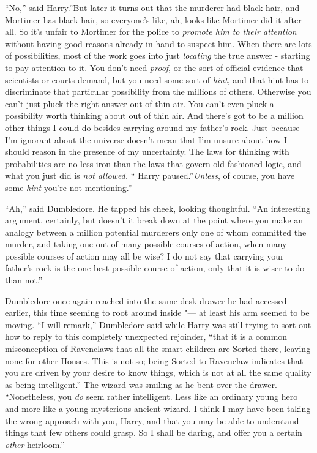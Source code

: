 ``No,'' said Harry.''But later it turns out that the murderer had black
hair, and Mortimer has black hair, so everyone's like, ah, looks like
Mortimer did it after all. So it's unfair to Mortimer for the police to
\emph{promote him to their attention} without having good reasons
already in hand to suspect him. When there are lots of possibilities,
most of the work goes into just \emph{locating} the true answer -
starting to pay attention to it. You don't need \emph{proof}, or the
sort of official evidence that scientists or courts demand, but you need
some sort of \emph{hint}, and that hint has to discriminate that
particular possibility from the millions of others. Otherwise you can't
just pluck the right answer out of thin air. You can't even pluck a
possibility worth thinking about out of thin air. And there's got to be
a million other things I could do besides carrying around my father's
rock. Just because I'm ignorant about the universe doesn't mean that I'm
unsure about how I should reason in the presence of my uncertainty. The
laws for thinking with probabilities are no less iron than the laws that
govern old-fashioned logic, and what you just did is \emph{not allowed.}
`` Harry paused.''\emph{Unless}, of course, you have some \emph{hint}
you're not mentioning.''

``Ah,'' said Dumbledore. He tapped his cheek, looking thoughtful. ``An
interesting argument, certainly, but doesn't it break down at the point
where you make an analogy between a million potential murderers only one
of whom committed the murder, and taking one out of many possible
courses of action, when many possible courses of action may all be wise?
I do not say that carrying your father's rock is the one best possible
course of action, only that it is wiser to do than not.''

Dumbledore once again reached into the same desk drawer he had accessed
earlier, this time seeming to root around inside "--- at least his arm
seemed to be moving. ``I will remark,'' Dumbledore said while Harry was
still trying to sort out how to reply to this completely unexpected
rejoinder, ``that it is a common misconception of Ravenclaws that all
the smart children are Sorted there, leaving none for other Houses. This
is not so; being Sorted to Ravenclaw indicates that you are driven by
your desire to know things, which is not at all the same quality as
being intelligent.'' The wizard was smiling as he bent over the drawer.
``Nonetheless, you \emph{do} seem rather intelligent. Less like an
ordinary young hero and more like a young mysterious ancient wizard. I
think I may have been taking the wrong approach with you, Harry, and
that you may be able to understand things that few others could grasp.
So I shall be daring, and offer you a certain \emph{other} heirloom.''

